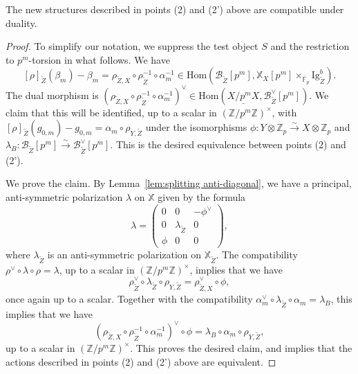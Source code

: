 \documentclass[letterpaper,11pt]{amsart}
\begin{document}
\begin{lemma}\label{lem: compatibility with polarization} The new structures described in points (2) and (2') above are compatible under duality. 
\end{lemma}

\begin{proof}

    
    To simplify our notation, we suppress the test object $S$ and the restriction to $p^m$-torsion in what follows. We have 
    \[
    [\rho]_{\widetilde{Z}}(\beta_m) - \beta_m =\rho_{\widetilde{Z},X}\circ \rho_{\widetilde{Z}}^{-1}\circ \alpha_m^{-1} \in \mathrm{Hom}\left(\mathcal{B}_{\widetilde{Z}}[p^m],\mathbb{X}_{X}[p^m]\times_{\overline{\mathbb{F}}_p}\mathrm{Ig}^b_{\widetilde{Z}}\right).
    \]
    The dual morphism is $(\rho_{\widetilde{Z},X}\circ \rho_{\widetilde{Z}}^{-1}\circ \alpha_m^{-1})^\vee \in \mathrm{Hom}(\underline{X/p^m X}, \mathcal{B}^\vee_{\widetilde{Z}}[p^m])$. We claim that this will be identified, up to a scalar in $(\mathbb{Z}/p^m\mathbb{Z})^\times$, with $[\rho]_{\widetilde{Z}}(g_{0,m})-g_{0,m} = \alpha_m\circ \rho_{Y, \widetilde{Z}}$ under the isomorphisms $\phi: Y\otimes \mathbb{Z}_p \stackrel{\sim}{\to}X\otimes \mathbb{Z}_p$ and $\lambda_B: \mathcal{B}_{\widetilde{Z}}[p^m]\stackrel{\sim}{\to}\mathcal{B}_{\widetilde{Z}}^\vee[p^m]$. This is the desired equivalence between points (2) and (2'). 
    
    We prove the claim. By Lemma~\ref{lem:splitting anti-diagonal}, we have a principal, anti-symmetric polarization $\lambda$ on $\mathbb{X}$ given by the formula 
    \[
    \lambda = \begin{pmatrix}
        0 & 0 & -\phi^\vee \\ 0& \lambda_{\widetilde{Z}} & 0 \\ 
        \phi & 0 & 0
    \end{pmatrix},
    \]
    where $\lambda_{\widetilde{Z}}$ is an anti-symmetric polarization on $\mathbb{X}_{\widetilde{Z}}$. The compatibility $\rho^\vee \circ \lambda \circ \rho = \lambda$,  up to a scalar in $(\mathbb{Z}/p^m\mathbb{Z})^\times$, implies that we have
    \begin{equation}\label{eq: compatibility with polarization}
    \rho_{\widetilde{Z}}^\vee\circ \lambda_{\widetilde{Z}}\circ \rho_{Y, \widetilde{Z}} = \rho_{\widetilde{Z},X}^\vee \circ \phi,
    \end{equation}
    once again up to a scalar. Together with the compatibility $\alpha_m^\vee \circ \lambda_{\widetilde{Z}}\circ \alpha_m =\lambda_B$, this implies that we have 
    \[
    (\rho_{\widetilde{Z},X}\circ \rho_{\widetilde{Z}}^{-1}\circ \alpha_m^{-1})^\vee \circ \phi = \lambda_B\circ \alpha_m\circ \rho_{Y,\widetilde{Z}},
    \]
    up to a scalar in $(\mathbb{Z}/p^m\mathbb{Z})^\times$. This proves the desired claim, and implies that the actions described in points (2) and (2') above are equivalent.
\end{proof}
\end{document}
